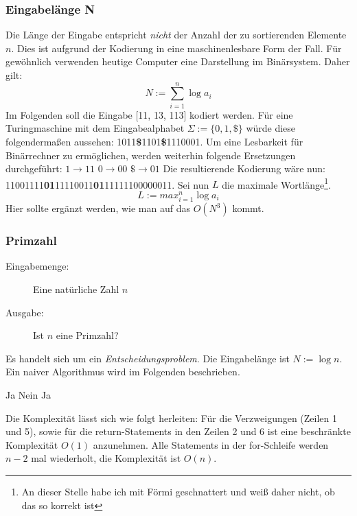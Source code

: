 \documentclass{article} %
\begin{document}
\subsubsection{Eingabelänge N}
Die Länge der Eingabe entspricht \emph{nicht} der Anzahl der zu sortierenden Elemente $n$.
Dies ist aufgrund der Kodierung in eine maschinenlesbare Form der Fall.
Für gewöhnlich verwenden heutige Computer eine Darstellung im Binärsystem. Daher gilt:
\begin{equation}
N := \sum_{i=1}^n \log a_i
\end{equation}
Im Folgenden soll die Eingabe [11, 13, 113] kodiert werden.
Für eine Turingmaschine mit dem Eingabealphabet $\Sigma := \{0,1,\$ \}$ würde diese folgendermaßen aussehen:
1011\textbf{\$}1101\textbf{\$}1110001.
Um eine Lesbarkeit für Binärrechner zu ermöglichen, werden weiterhin folgende Ersetzungen durchgeführt:
$1 \rightarrow 11$
$0 \rightarrow 00$
$\$ \rightarrow 01$
Die resultierende Kodierung wäre nun:
11001111\textbf{01}11110011\textbf{01}11111100000011.
Sei nun $L$ die maximale Wortlänge\footnote{An dieser Stelle habe ich mit Förmi geschnattert und weiß daher nicht, ob das so korrekt ist}.
\begin{equation}
L := max_{i=1}^n \log a_i
\end{equation}
Hier sollte ergänzt werden, wie man auf das $O(N^3)$ kommt.

\subsubsection{Primzahl}
\begin{description}
	\item[Eingabemenge:] Eine natürliche Zahl $n$
	\item[Ausgabe:] Ist $n$ eine Primzahl? 
\end{description}
Es handelt sich um ein \emph{Entscheidungsproblem}.
Die Eingabelänge ist $N := \log n$.
Ein naiver Algorithmus wird im Folgenden beschrieben.

\begin{algorithmic}[1]
	 \State \Return Ja
	\Else {}
			\State \Return Nein
		\Else
		\EndIf
	\EndFor
	\State \Return Ja
	\EndIf
\end{algorithmic}

Die Komplexität lässt sich wie folgt herleiten:
Für die Verzweigungen (Zeilen 1 und 5), sowie für die return-Statements in den Zeilen 2 und 6 ist eine beschränkte Komplexität $O(1)$ anzunehmen.
Alle Statements in der for-Schleife werden $n-2$ mal wiederholt, die Komplexität ist $O(n)$.
\end{document}
